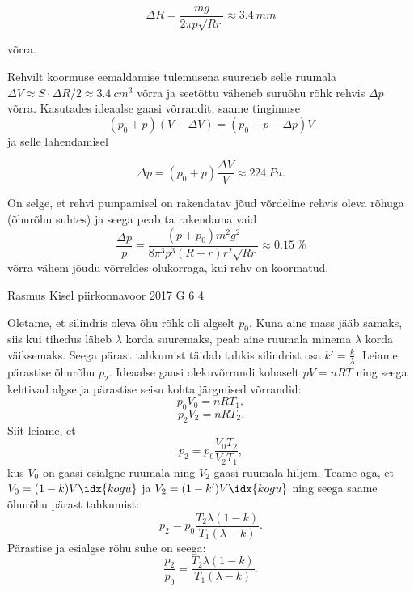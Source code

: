 \documentclass[11pt]{article}
\begin{document}
{{\begin{equation}
\Delta R=\frac{mg}{2\pi p\sqrt{Rr}}\approx\SI{3.4}{mm}
\end{equation}

\noindent võrra.

Rehvilt koormuse eemaldamise tulemusena suureneb selle ruumala $\Delta V\approx S\cdot\Delta R/2\approx\SI{3.4}{cm^{3}}$ võrra ja seetõttu väheneb suruõhu rõhk rehvis $\Delta p$ võrra. Kasutades ideaalse gaasi võrrandit, saame tingimuse
\[
\left(p_{0}+p\right)\left(V-\Delta V\right)=\left(p_{0}+p-\Delta p\right)V
\]
ja selle lahendamisel

\begin{equation}
\Delta p=\left(p_{0}+p\right)\frac{\Delta V}{V}\approx\SI{224}{Pa}.
\end{equation}

On selge, et rehvi pumpamisel on rakendatav jõud võrdeline rehvis oleva rõhuga (õhurõhu suhtes) ja seega peab ta rakendama vaid 
\[
\frac{\Delta p}{p}=\frac{\left(p+p_{0}\right)m^{2}g^{2}}{8\pi^{3}p^{3}\left(R-r\right)r^{2}\sqrt{Rr}}\approx\SI{0.15}{\percent}
\]
võrra vähem jõudu võrreldes olukorraga, kui rehv on koormatud.
\fi
}

{Rasmus Kisel} %
{piirkonnavoor} %
{2017} %
{G 6} %
{4} %
{

\ifSolution
Oletame, et silindris oleva õhu rõhk oli algselt $p_{0}$. Kuna aine mass jääb samaks, siis kui tihedus läheb $\lambda$ korda suuremaks, peab aine ruumala minema $\lambda$ korda väiksemaks. Seega pärast tahkumist täidab tahkis silindrist osa $k'=\frac{k}{\lambda}$. Leiame pärastise õhurõhu $p_{2}$. Ideaalse gaasi olekuvõrrandi kohaselt $pV=nRT$ ning seega kehtivad algse ja pärastise seisu kohta järgmised võrrandid:
\begin{equation*}
p_{0}V_{0}=nRT_{1},
\end{equation*}
\begin{equation*}
p_{2}V_{2}=nRT_{2}.
\end{equation*}
Siit leiame, et
\[
p_{2}=p_{0}\frac{V_{0}T_{2}}{V_{2}T_{1}},
\]
kus $V_{0}$ on gaasi esialgne ruumala ning $V_{2}$ gaasi ruumala hiljem. Teame aga, et $V_{0}=(1-k)V\idx{kogu}$ ja $V_{2}=(1-k')V\idx{kogu}$ ning seega saame õhurõhu pärast tahkumist:
\begin{equation*}
p_{2}=p_{0}\frac{T_{2}\lambda (1-k)}{T_{1}(\lambda-k)}.
\end{equation*}
Pärastise ja esialgse rõhu suhe on seega:
\begin{equation*}
\frac{p_{2}}{p_{0}}=\frac{T_{2}\lambda(1-k)}{T_{1}(\lambda-k)}.
\end{equation*}
\fi
}

}
\end{document}
